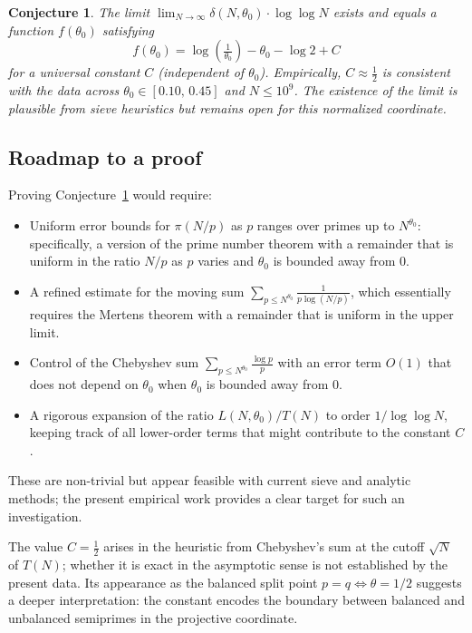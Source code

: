 \documentclass[11pt]{article}
\newtheorem{conjecture}{Conjecture}
\theoremstyle{definition}
\begin{document}
\begin{conjecture}\label{conj:prefactor}
The limit \(\lim_{N\to\infty}\delta(N,\theta_0)\cdot\log\log N\) exists and equals a
function \(f(\theta_0)\) satisfying
\[
  f(\theta_0) = \log\!\left(\tfrac{1}{\theta_0}\right) - \theta_0 - \log 2 + C
\]
for a universal constant \(C\) (independent of \(\theta_0\)).  Empirically,
\(C \approx \tfrac{1}{2}\) is consistent with the data across
\(\theta_0 \in [0.10,\,0.45]\) and \(N \leq 10^9\).
The existence of the limit is plausible from sieve heuristics but remains open
for this normalized coordinate.
\end{conjecture}

\subsection*{Roadmap to a proof}
Proving Conjecture~\ref{conj:prefactor} would require:
\begin{itemize}
  \item Uniform error bounds for \(\pi(N/p)\) as \(p\) ranges over
        primes up to \(N^{\theta_0}\): specifically, a version of the
        prime number theorem with a remainder that is uniform in the
        ratio \(N/p\) as \(p\) varies and \(\theta_0\) is bounded away from \(0\).
  \item A refined estimate for the moving sum
        \(\sum_{p\le N^{\theta_0}} \frac{1}{p\log(N/p)}\),
        which essentially requires the Mertens theorem with a remainder that is
        uniform in the upper limit.
  \item Control of the Chebyshev sum \(\sum_{p\le N^{\theta_0}} \frac{\log p}{p}\)
        with an error term \(O(1)\) that does not depend on \(\theta_0\) when
        \(\theta_0\) is bounded away from 0.
  \item A rigorous expansion of the ratio \(L(N,\theta_0)/T(N)\) to order
        \(1/\log\log N\), keeping track of all lower-order terms that might
        contribute to the constant \(C\).
\end{itemize}
These are non-trivial but appear feasible with current sieve and analytic methods;
the present empirical work provides a clear target for such an investigation.

The value \(C = \tfrac{1}{2}\) arises in the heuristic from Chebyshev's sum at the
cutoff \(\sqrt{N}\) of \(T(N)\); whether it is exact in the asymptotic sense is not
established by the present data.  Its appearance as the balanced split point
\(p = q \Leftrightarrow \theta = 1/2\) suggests a deeper interpretation: the constant
encodes the boundary between balanced and unbalanced semiprimes in the projective
coordinate.
\end{document}
